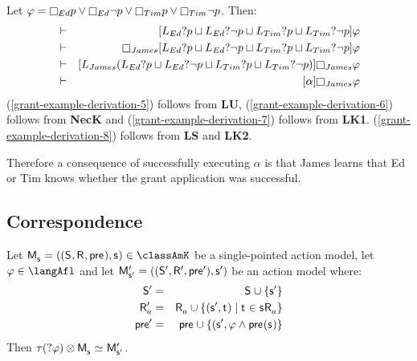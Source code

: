 \begin{example}
Let $\phi = \necessary[Ed] \atomP \lor  \necessary[Ed] \neg \atomP \lor \necessary[Tim] \atomP \lor \necessary[Tim] \neg \atomP$. Then:
\begin{eqnarray}
    &\proves& \actionA{\learns[Ed] \test{\atomP} \choice \learns[Ed] \test{\neg \atomP} \choice \learns[Tim] \test{\atomP} \choice \learns[Tim] \test{\neg \atomP}} \phi\label{grant-example-derivation-5}\\
    &\proves& \necessary[James] \actionA{\learns[Ed] \test{\atomP} \choice \learns[Ed] \test{\neg \atomP} \choice \learns[Tim] \test{\atomP} \choice \learns[Tim] \test{\neg \atomP}} \phi\label{grant-example-derivation-6}\\
    &\proves& \actionA{\learns[James] (\learns[Ed] \test{\atomP} \choice \learns[Ed] \test{\neg \atomP} \choice \learns[Tim] \test{\atomP} \choice \learns[Tim] \test{\neg \atomP})} \necessary[James] \phi\label{grant-example-derivation-7}\\
    &\proves& \actionA{\alpha} \necessary[James] \phi\label{grant-example-derivation-8}
\end{eqnarray}
(\ref{grant-example-derivation-5}) follows from {\bf LU},
(\ref{grant-example-derivation-6}) follows from {\bf NecK} and
(\ref{grant-example-derivation-7}) follows from {\bf LK1}.
(\ref{grant-example-derivation-8}) follows from {\bf LS} and {\bf LK2}.

Therefore a consequence of successfully executing $\alpha$ is that James learns that Ed or Tim knows whether the grant application was successful.
\end{example}

\subsection{Correspondence}

\begin{lemma}\label{afl-k-construction-test}
Let $\aPModelAndTuple{\aStateS} \in \classAmK$ be a single-pointed action model, let $\phi \in \langAfl$ and let $\aPModelAndTupleP{\aStateSP}$ be an action model where:
\begin{eqnarray*}
    \aStatesP &=& \aStates \cup \{\aStateSP\}\\
    \aAccessibilityPA &=& \aAccessibilityA \cup \{(\aStateSP, \aStateT) \mid \aStateT \in \aSuccessorsA{\aStateS}\}\\
    \aPreconditionP &=& \aPrecondition \cup \{(\aStateSP, \phi \land \aPrecondition(\aStateS)\}
\end{eqnarray*}
Then $\tau(\test{\phi}) \exec \aPModel{\aStateS} \bisimilar \aPModelP{\aStateSP}$.
\end{lemma}

